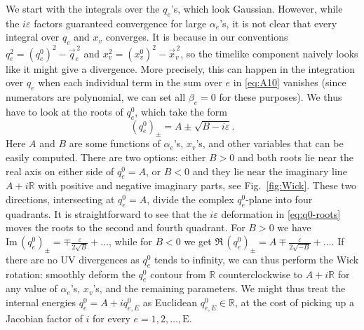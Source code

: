 \documentclass[12pt]{article}
\numberwithin{figure}{section}
\def \be {\begin{equation}}
\def \ee {\end{equation}}
\def \R {\mathbb{R}}
\def \E {\mathrm{E}}
\def \eps {\varepsilon}
\def \Im {\mathrm{Im}}
\begin{document}
We start with the integrals over the $q_e$'s, which look Gaussian. However, while the $i\eps$ factors guaranteed convergence for large $\alpha_e$'s, 
it is not clear that every integral over $q_e$ and $x_v$ converges. It is because in our conventions $q_e^2 = (q_e^0)^2 - \vec{q}_e^{\,2}$ and $x_v^2 = (x_v^0)^2 - \vec{x}_v^{\,2}$, so the timelike component naively looks like it might give a divergence. More precisely, this can happen in the integration over $q_e$ when each individual term in the sum over $e$ in \eqref{eq:A10} vanishes (since numerators are polynomial, we can set all $\beta_e = 0$ for these purposes). We thus have to look at the roots of $q_e^0$, which take the form
%
\be\label{eq:q0-roots}
(q_e^0)_\pm = A \pm \sqrt{B - i\eps}.
\ee
%
Here $A$ and $B$ are some functions of $\alpha_e$'s, $x_v$'s, and other variables that can be easily computed.
There are two options: either $B>0$ and both roots lie near the real axis on either side of $q_e^0 = A$, or $B<0$ and they lie near the imaginary line $A + i\R$ with positive and negative imaginary parts, see Fig.~\ref{fig:Wick}. These two directions, intersecting at $q_e^0 = A$, divide the complex $q_e^0$-plane into four quadrants. It is straightforward to see that the $i\eps$ deformation in \eqref{eq:q0-roots} moves the roots to the second and fourth quadrant. For $B>0$ we have $\Im\, (q_e^0)_\pm = \mp \tfrac{\eps}{2\sqrt{B}} + \ldots$, while for $B<0$ we get $\Re\, (q_e^0)_\pm = A \mp \tfrac{\eps}{2\sqrt{-B}} + \ldots$. If there are no UV divergences as $q_e^0$ tends to infinity, we can thus perform the Wick rotation: smoothly deform the $q_e^0$ contour from $\R$ counterclockwise to $A + i \R$ for any value of $\alpha_e$'s, $x_v$'s, and the remaining parameters. We might thus treat the internal energies $q_e^0 = A + i q_{e,E}^0$ as Euclidean $q_{e,E}^0 \in \R$, at the cost of picking up a Jacobian factor of $i$ for every $e = 1,2,\ldots,\E$.
\end{document}
